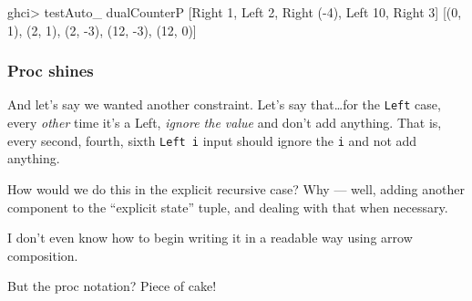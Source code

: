 \documentclass[]{article}
\newenvironment{Shaded}{}{}
\newcommand{\DataTypeTok}[1]{\textcolor[rgb]{0.56,0.13,0.00}{{#1}}}
\newcommand{\DecValTok}[1]{\textcolor[rgb]{0.25,0.63,0.44}{{#1}}}
\newcommand{\FunctionTok}[1]{\textcolor[rgb]{0.02,0.16,0.49}{{#1}}}
\newcommand{\NormalTok}[1]{{#1}}
\begin{document}
\begin{Shaded}
\begin{Highlighting}[]
\NormalTok{ghci}\FunctionTok{>} \NormalTok{testAuto_ dualCounterP [}\DataTypeTok{Right} \DecValTok{1}\NormalTok{, }\DataTypeTok{Left} \DecValTok{2}\NormalTok{, }\DataTypeTok{Right} \NormalTok{(}\FunctionTok{-}\DecValTok{4}\NormalTok{), }\DataTypeTok{Left} \DecValTok{10}\NormalTok{, }\DataTypeTok{Right} \DecValTok{3}\NormalTok{]}
\NormalTok{[(}\DecValTok{0}\NormalTok{, }\DecValTok{1}\NormalTok{), (}\DecValTok{2}\NormalTok{, }\DecValTok{1}\NormalTok{), (}\DecValTok{2}\NormalTok{, }\FunctionTok{-}\DecValTok{3}\NormalTok{), (}\DecValTok{12}\NormalTok{, }\FunctionTok{-}\DecValTok{3}\NormalTok{), (}\DecValTok{12}\NormalTok{, }\DecValTok{0}\NormalTok{)]}
\end{Highlighting}
\end{Shaded}

\subsubsection{Proc shines}\label{proc-shines}

And let's say we wanted another constraint. Let's say that\ldots{}for the
\texttt{Left} case, every \emph{other} time it's a Left, \emph{ignore the value}
and don't add anything. That is, every second, fourth, sixth \texttt{Left\ i}
input should ignore the \texttt{i} and not add anything.

How would we do this in the explicit recursive case? Why --- well, adding
another component to the ``explicit state'' tuple, and dealing with that when
necessary.

I don't even know how to begin writing it in a readable way using arrow
composition.

But the proc notation? Piece of cake!
\end{document}
